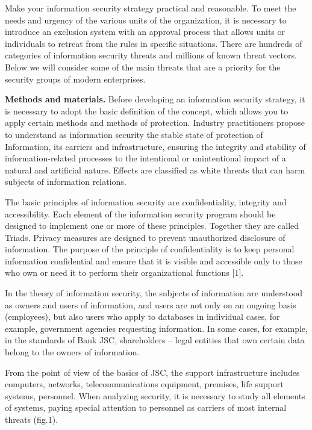Make your information security strategy practical and reasonable. To
meet the needs and urgency of the various units of the organization, it
is necessary to introduce an exclusion system with an approval process
that allows units or individuals to retreat from the rules in specific
situations. There are hundreds of categories of information security
threats and millions of known threat vectors. Below we will consider
some of the main threats that are a priority for the security groups of
modern enterprises.

{\bfseries Methods and materials.} Before developing an information
security strategy, it is necessary to adopt the basic definition of the
concept, which allows you to apply certain methods and methods of
protection. Industry practitioners propose to understand as information
security the stable state of protection of Information, its carriers and
infrastructure, ensuring the integrity and stability of
information-related processes to the intentional or unintentional impact
of a natural and artificial nature. Effects are classified as white
threats that can harm subjects of information relations.

The basic principles of information security are confidentiality,
integrity and accessibility. Each element of the information security
program should be designed to implement one or more of these principles.
Together they are called Triads. Privacy measures are designed to
prevent unauthorized disclosure of information. The purpose of the
principle of confidentiality is to keep personal information
confidential and ensure that it is visible and accessible only to those
who own or need it to perform their organizational functions {[}1{]}.

In the theory of information security, the subjects of information are
understood as owners and users of information, and users are not only on
an ongoing basis (employees), but also users who apply to databases in
individual cases, for example, government agencies requesting
information. In some cases, for example, in the standards of Bank JSC,
shareholders -- legal entities that own certain data belong to the
owners of information.

From the point of view of the basics of JSC, the support infrastructure
includes computers, networks, telecommunications equipment, premises,
life support systems, personnel. When analyzing security, it is
necessary to study all elements of systems, paying special attention to
personnel as carriers of most internal threats (fig.1).

